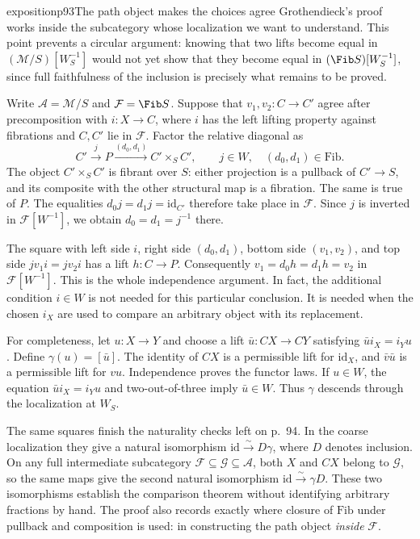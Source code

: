 \begin{dcomment}{exposition}{p93}{The path object makes the choices agree}
Grothendieck's proof works inside the subcategory whose localization we want to understand. This point prevents a circular argument: knowing that two lifts become equal in $(\mathcal M/S)[W_S^{-1}]$ would not yet show that they become equal in $(\Fib S)[W_S^{-1}]$, since full faithfulness of the inclusion is precisely what remains to be proved.

Write $\mathcal A=\mathcal M/S$ and $\mathcal F=\Fib S$. Suppose that $v_1,v_2:C\to C'$ agree after precomposition with $i:X\to C$, where $i$ has the left lifting property against fibrations and $C,C'$ lie in $\mathcal F$. Factor the relative diagonal as
\[
 C'\xrightarrow{j}P\xrightarrow{(d_0,d_1)}C'\times_S C',
 \qquad j\in W,\quad (d_0,d_1)\in\mathrm{Fib}.
\]
The object $C'\times_S C'$ is fibrant over $S$: either projection is a pullback of $C'\to S$, and its composite with the other structural map is a fibration. The same is true of $P$. The equalities $d_0j=d_1j=\mathrm{id}_{C'}$ therefore take place in $\mathcal F$. Since $j$ is inverted in $\mathcal F[W^{-1}]$, we obtain $d_0=d_1=j^{-1}$ there.

The square with left side $i$, right side $(d_0,d_1)$, bottom side $(v_1,v_2)$, and top side $jv_1i=jv_2i$ has a lift $h:C\to P$. Consequently $v_1=d_0h=d_1h=v_2$ in $\mathcal F[W^{-1}]$. This is the whole independence argument. In fact, the additional condition $i\in W$ is not needed for this particular conclusion. It is needed when the chosen $i_X$ are used to compare an arbitrary object with its replacement.

For completeness, let $u:X\to Y$ and choose a lift $\bar u:CX\to CY$ satisfying $\bar u i_X=i_Yu$. Define $\gamma(u)=[\bar u]$. The identity of $CX$ is a permissible lift for $\mathrm{id}_X$, and $\bar v\bar u$ is a permissible lift for $vu$. Independence proves the functor laws. If $u\in W$, the equation $\bar u i_X=i_Yu$ and two-out-of-three imply $\bar u\in W$. Thus $\gamma$ descends through the localization at $W_S$.

The same squares finish the naturality checks left on p.~94. In the coarse localization they give a natural isomorphism $\mathrm{id}\xrightarrow{\sim}D\gamma$, where $D$ denotes inclusion. On any full intermediate subcategory $\mathcal F\subseteq\mathcal G\subseteq\mathcal A$, both $X$ and $CX$ belong to $\mathcal G$, so the same maps give the second natural isomorphism $\mathrm{id}\xrightarrow{\sim}\gamma D$. These two isomorphisms establish the comparison theorem without identifying arbitrary fractions by hand. The proof also records exactly where closure of $\mathrm{Fib}$ under pullback and composition is used: in constructing the path object \emph{inside} $\mathcal F$.
\end{dcomment}

